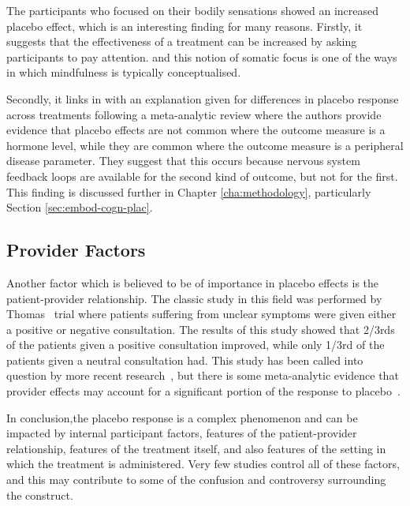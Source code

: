 The participants who focused on their bodily sensations showed an increased placebo effect, which is an interesting finding for many reasons. Firstly, it suggests that the effectiveness of a treatment can be increased by asking participants to pay attention.%
and this notion of somatic focus is one of the ways in which mindfulness is typically conceptualised. 

Secondly, it links in with an explanation given for differences in placebo response across treatments following a meta-analytic review \cite{Meissner2007} where the authors provide evidence that placebo effects are not common where the outcome measure is a hormone level, while they are common where the outcome measure is a peripheral disease parameter. They suggest that this occurs because nervous system feedback loops are available for the second kind of outcome, but not for the first. This finding is discussed further in Chapter \ref{cha:methodology}, particularly Section \ref{sec:embod-cogn-plac}. 

\subsection{Provider Factors}

Another factor which is believed to be of importance in placebo effects is the patient-provider relationship. The classic study in this field was performed by Thomas~\cite{Thomas1994}  trial where  patients suffering from unclear symptoms were given either a positive or negative consultation.  The results of this study showed that 2/3rds of the patients given a positive consultation improved, while only 1/3rd of the patients given a neutral consultation had. This study has been called into question by more recent research~\cite{Knipschild2005}, but there is some meta-analytic evidence that provider effects may account for a significant portion of the response to placebo~\cite{DiBlasi2001}.



In conclusion,the placebo response is a complex phenomenon and can be impacted by internal  participant factors, features of the patient-provider relationship, features of the treatment itself, and also features of the setting in which the treatment is administered. Very few studies control all of these factors, and this may contribute to some of the confusion and controversy surrounding the construct. 

